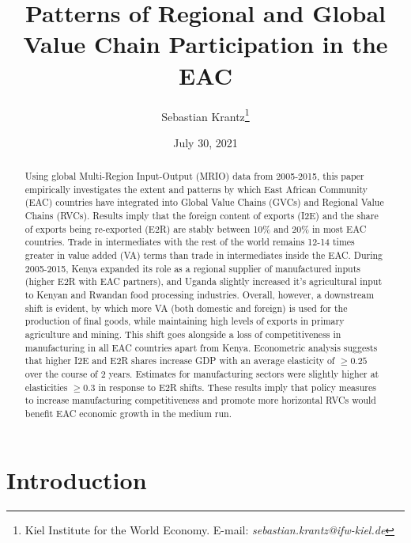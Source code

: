 \documentclass[a4paper]{article}
\date{July 30, 2021}
\title{\textbf{Patterns of Regional and Global Value Chain Participation in the EAC}}
\author{Sebastian Krantz\footnote{Kiel Institute for the World Economy. E-mail: \emph{sebastian.krantz@ifw-kiel.de}}}
\begin{document}
\maketitle

\begin{abstract}
Using global Multi-Region Input-Output (MRIO) data from 2005-2015, this paper empirically investigates the extent and patterns by which East African Community (EAC) countries have integrated into Global Value Chains (GVCs) and Regional Value Chains (RVCs). Results imply that the foreign content of exports (I2E) and the share of exports being re-exported (E2R) are stably between 10\% and 20\% in most EAC countries. Trade in intermediates with the rest of the world remains 12-14 times greater in value added (VA) terms than trade in intermediates inside the EAC. During 2005-2015, Kenya expanded its role as a regional supplier of manufactured inputs (higher E2R with EAC partners), and Uganda slightly increased it's agricultural input to Kenyan and Rwandan food processing industries. Overall, however,  a downstream shift is evident, by which more VA (both domestic and foreign) is used for the production of final goods, while maintaining high levels of exports in primary agriculture and mining. This shift goes alongside a loss of competitiveness in manufacturing in all EAC countries apart from Kenya. Econometric analysis suggests that higher I2E and E2R shares increase GDP with an average elasticity of $\geq 0.25$ over the course of 2 years. Estimates for manufacturing sectors were slightly higher at elasticities $\geq 0.3$ in response to E2R shifts. These results imply that policy measures to increase manufacturing competitiveness and promote more horizontal RVCs would benefit EAC economic growth in the medium run. 
\end{abstract}


\section{Introduction}
\end{document}
